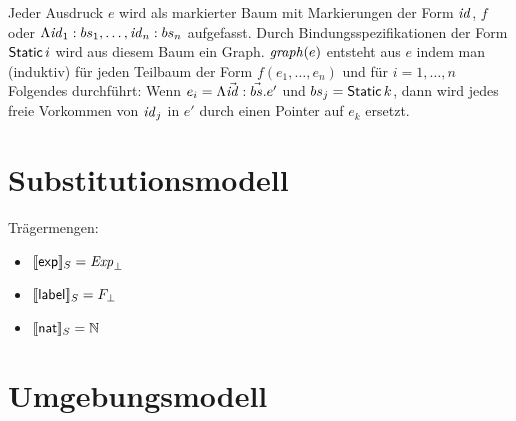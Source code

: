 \documentclass[12pt,a4paper]{article}
\begin{document}
Jeder Ausdruck $e$ wird als markierter Baum mit Markierungen der Form $\mathit{id}$, $f$ oder
$\Lambda \mathit{id}_1:bs_1,\ldots,\mathit{id}_n:bs_n$ aufgefasst. Durch Bindungsspezifikationen der
Form $\mathsf{Static}\,i$ wird aus diesem Baum ein Graph. $\mathit{graph}(e)$ entsteht aus
$e$ indem man (induktiv) f\"ur jeden Teilbaum der Form $f(e_1,\ldots,e_n)$ und
f\"ur $i=1,\ldots,n$ Folgendes durchf\"uhrt: Wenn $e_i = \Lambda \vec{\mathit{id}}:\vec{bs}.e'$
und $bs_j = \mathsf{Static}\,k$, dann wird jedes freie Vorkommen von $\mathit{id}_j$ in $e'$
durch einen Pointer auf $e_k$ ersetzt.


\section*{Substitutionsmodell}

Tr\"agermengen:
\begin{itemize}
\item $[\![\mathsf{exp}]\!]_S = \mathit{Exp}_\bot$
\item $[\![\mathsf{label}]\!]_S = F_\bot$
\item $[\![\mathsf{nat}]\!]_S = \mathbb N$
\end{itemize}


\section*{Umgebungsmodell}
\end{document}
